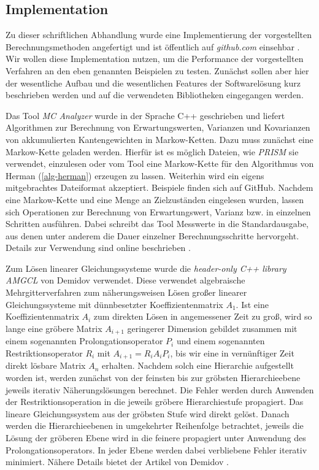 \documentclass[a4paper]{article}
\newcommand{\mc}{Markow-Kette}
\theoremstyle{nonumberplain}
\begin{document}
	\subsection{Implementation}
	
	Zu dieser schriftlichen Abhandlung wurde eine Implementierung der vorgestellten Berechnungsmethoden angefertigt und ist öffentlich auf \textit{github.com} einsehbar \cite{MCA}. Wir wollen diese Implementation nutzen, um die Performance der vorgestellten Verfahren an den eben genannten Beispielen zu testen. Zunächst sollen aber hier der wesentliche Aufbau und die wesentlichen Features der Softwarelösung kurz beschrieben werden und auf die verwendeten Bibliotheken eingegangen werden.
	
	
	Das Tool \textit{MC Analyzer} \cite{MCA} wurde in der Sprache C++ geschrieben und liefert Algorithmen zur Berechnung von Erwartungswerten, Varianzen und Kovarianzen von akkumulierten Kantengewichten in \mc n.
	Dazu muss zunächst eine \mc{} geladen werden. Hierfür ist es möglich Dateien, wie \textit{PRISM} \cite{PRISMCS} sie verwendet, einzulesen oder vom Tool eine \mc{} für den Algorithmus von Herman (\ref{alg-herman}) erzeugen zu lassen. Weiterhin wird ein eigens mitgebrachtes Dateiformat akzeptiert. Beispiele finden sich auf GitHub. Nachdem eine \mc{} und eine Menge an Zielzuständen eingelesen wurden, lassen sich Operationen zur Berechnung von Erwartungswert, Varianz bzw. \cov{} in einzelnen Schritten ausführen. Dabei schreibt das Tool Messwerte in die Standardausgabe, aus denen unter anderem die Dauer einzelner Berechnungsschritte hervorgeht. Details zur Verwendung sind online beschrieben \cite{MCA}.
	
	
	Zum Lösen linearer Gleichungssysteme wurde die \textit{header-only C++ library AMGCL} von Demidov \cite{Demidov2019} verwendet. Diese verwendet algebraische Mehrgitterverfahren zum näherungsweisen Lösen großer linearer Gleichungssysteme mit dünnbesetzter Koeffizientenmatrix $A_1$. 
	Ist eine Koeffizientenmatrix $A_i$ zum direkten Lösen in angemessener Zeit zu groß, wird so lange eine gröbere Matrix $A_{i+1}$ geringerer Dimension gebildet zusammen mit einem sogenannten Prolongationsoperator $P_i$ und einem sogenannten Restriktionsoperator $R_i$ mit $A_{i+1} = R_iA_iP_i$, bis wir eine in vernünftiger Zeit direkt lösbare Matrix $A_n$ erhalten. Nachdem solch eine Hierarchie aufgestellt worden ist, werden zunächst von der feinsten bis zur gröbsten Hierarchieebene jeweils iterativ Näherungslösungen berechnet. Die Fehler werden durch Anwenden der Restriktionsoperation in die jeweils gröbere Hierarchiestufe propagiert. Das lineare Gleichungssystem aus der gröbsten Stufe wird direkt gelöst. Danach werden die Hierarchieebenen in umgekehrter Reihenfolge betrachtet, jeweils die Lösung der gröberen Ebene wird in die feinere propagiert unter Anwendung des Prolongationsoperators. In jeder Ebene werden dabei verbliebene Fehler iterativ minimiert. Nähere Details bietet der Artikel von Demidov \cite{Demidov2019}.
	
\end{document}
